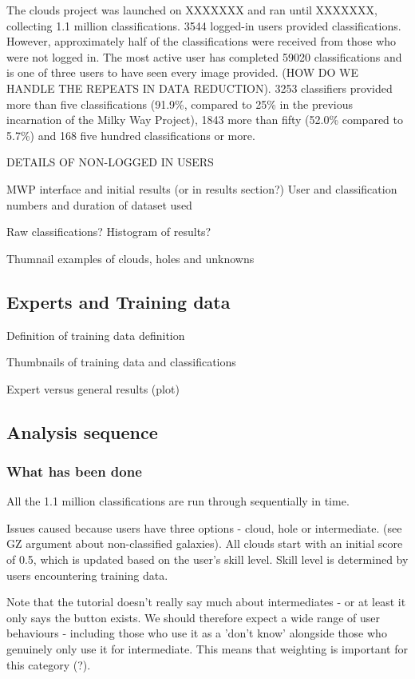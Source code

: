 \documentclass[a4,useAMS,usenatbib]{mn2e}
\begin{document}
The clouds project was launched on XXXXXXX and ran until XXXXXXX, collecting 1.1 million classifications. 3544 logged-in users provided classifications. However, approximately half of the classifications were received from those who were not logged in. The most active user has completed 59020 classifications and is one of three users to have seen every image provided. (HOW DO WE HANDLE THE REPEATS IN DATA REDUCTION). 3253 classifiers provided more than five classifications (91.9\%, compared to 25\% in the previous incarnation of the Milky Way Project), 1843 more than fifty (52.0\% compared to 5.7\%) and 168 five hundred classifications or more. 

DETAILS OF NON-LOGGED IN USERS


MWP interface and initial results (or in results section?)
User and classification numbers and duration of dataset used

Raw classifications?
Histogram of results?

Thumnail examples of clouds, holes and unknowns

\subsection{Experts and Training data}
Definition of training data definition

Thumbnails of training data and classifications

Expert versus general results (plot)

\subsection{Analysis sequence}

\subsubsection{What has been done}

All the 1.1 million classifications are run through sequentially in time.

Issues caused because users have three options - cloud, hole or intermediate. (see GZ argument about non-classified galaxies). All clouds start with an initial score of 0.5, which is updated based on the user's skill level. Skill level is determined by users encountering training data. 

Note that the tutorial doesn't really say much about intermediates - or at least it only says the button exists. We should therefore expect a wide range of user behaviours - including those who use it as a 'don't know' alongside those who genuinely only use it for intermediate. This means that weighting is important for this category (?). 
\end{document}
